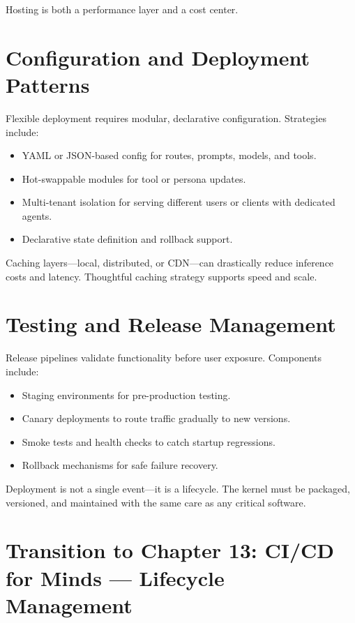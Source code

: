 \documentclass{book}
\begin{document}
Hosting is both a performance layer and a cost center.

\section{Configuration and Deployment Patterns}

Flexible deployment requires modular, declarative configuration. Strategies include:

\begin{itemize}
  \item YAML or JSON-based config for routes, prompts, models, and tools.
  \item Hot-swappable modules for tool or persona updates.
  \item Multi-tenant isolation for serving different users or clients with dedicated agents.
  \item Declarative state definition and rollback support.
\end{itemize}

Caching layers—local, distributed, or CDN—can drastically reduce inference costs and latency. Thoughtful caching strategy supports speed and scale.

\section{Testing and Release Management}

Release pipelines validate functionality before user exposure. Components include:

\begin{itemize}
  \item Staging environments for pre-production testing.
  \item Canary deployments to route traffic gradually to new versions.
  \item Smoke tests and health checks to catch startup regressions.
  \item Rollback mechanisms for safe failure recovery.
\end{itemize}

Deployment is not a single event—it is a lifecycle. The kernel must be packaged, versioned, and maintained with the same care as any critical software.

\section*{Transition to Chapter 13: CI/CD for Minds — Lifecycle Management}
\end{document}
